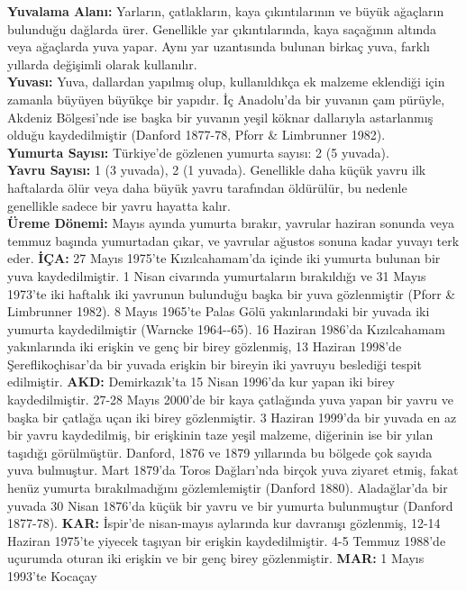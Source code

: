 \documentclass[
  letterpaper,
  DIV=11,
  numbers=noendperiod]{scrreprt}
\begin{document}
\textbf{Yuvalama Alanı:} Yarların, çatlakların, kaya çıkıntılarının ve
büyük ağaçların bulunduğu dağlarda ürer. Genellikle yar çıkıntılarında,
kaya saçağının altında veya ağaçlarda yuva yapar. Aynı yar uzantısında
bulunan birkaç yuva, farklı yıllarda değişimli olarak kullanılır.\\
\textbf{Yuvası:} Yuva, dallardan yapılmış olup, kullanıldıkça ek malzeme
eklendiği için zamanla büyüyen büyükçe bir yapıdır. İç Anadolu'da bir
yuvanın çam pürüyle, Akdeniz Bölgesi'nde ise başka bir yuvanın yeşil
köknar dallarıyla astarlanmış olduğu kaydedilmiştir (Danford 1877-78,
Pforr \& Limbrunner 1982).\\
\textbf{Yumurta Sayısı:} Türkiye'de gözlenen yumurta sayısı: 2 (5
yuvada).\\
\textbf{Yavru Sayısı:} 1 (3 yuvada), 2 (1 yuvada). Genellikle daha küçük
yavru ilk haftalarda ölür veya daha büyük yavru tarafından öldürülür, bu
nedenle genellikle sadece bir yavru hayatta kalır.\\
\textbf{Üreme Dönemi:} Mayıs ayında yumurta bırakır, yavrular haziran
sonunda veya temmuz başında yumurtadan çıkar, ve yavrular ağustos sonuna
kadar yuvayı terk eder. \textbf{İÇA:} 27 Mayıs 1975'te Kızılcahamam'da
içinde iki yumurta bulunan bir yuva kaydedilmiştir. 1 Nisan civarında
yumurtaların bırakıldığı ve 31 Mayıs 1973'te iki haftalık iki yavrunun
bulunduğu başka bir yuva gözlenmiştir (Pforr \& Limbrunner 1982). 8
Mayıs 1965'te Palas Gölü yakınlarındaki bir yuvada iki yumurta
kaydedilmiştir (Warncke 1964-\/-65). 16 Haziran 1986'da Kızılcahamam
yakınlarında iki erişkin ve genç bir birey gözlenmiş, 13 Haziran 1998'de
Şereflikoçhisar'da bir yuvada erişkin bir bireyin iki yavruyu beslediği
tespit edilmiştir. \textbf{AKD:} Demirkazık'ta 15 Nisan 1996'da kur
yapan iki birey kaydedilmiştir. 27-28 Mayıs 2000'de bir kaya çatlağında
yuva yapan bir yavru ve başka bir çatlağa uçan iki birey gözlenmiştir. 3
Haziran 1999'da bir yuvada en az bir yavru kaydedilmiş, bir erişkinin
taze yeşil malzeme, diğerinin ise bir yılan taşıdığı görülmüştür.
Danford, 1876 ve 1879 yıllarında bu bölgede çok sayıda yuva bulmuştur.
Mart 1879'da Toros Dağları'nda birçok yuva ziyaret etmiş, fakat henüz
yumurta bırakılmadığını gözlemlemiştir (Danford 1880). Aladağlar'da bir
yuvada 30 Nisan 1876'da küçük bir yavru ve bir yumurta bulunmuştur
(Danford 1877-78). \textbf{KAR:} İspir'de nisan-mayıs aylarında kur
davranışı gözlenmiş, 12-14 Haziran 1975'te yiyecek taşıyan bir erişkin
kaydedilmiştir. 4-5 Temmuz 1988'de uçurumda oturan iki erişkin ve bir
genç birey gözlenmiştir. \textbf{MAR:} 1 Mayıs 1993'te Kocaçay
\end{document}

